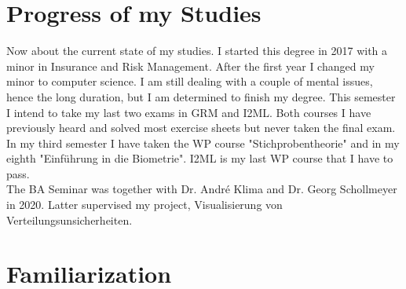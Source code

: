 \documentclass[12pt, a4paper]{report}
\begin{document}
\section*{Progress of my Studies}
	Now about the current state of my studies. I started this degree in	2017 with a minor in Insurance and Risk Management. After the first year I changed my minor to computer science. I am still dealing with a couple of mental issues, hence the long duration, but I am determined to finish my degree. This semester I intend to take my last two exams in GRM and I2ML. Both courses I have previously heard and solved most exercise sheets but never taken the final exam.\\
	In my third semester I have taken the WP course "Stichprobentheorie" and in my eighth "Einführung in die Biometrie". I2ML is my last WP course that I have to pass.\\
	The BA Seminar was together with Dr. André Klima and Dr. Georg Schollmeyer in 2020. Latter supervised my project, Visualisierung von Verteilungsunsicherheiten.
\section*{Familiarization}
	
\end{document}

